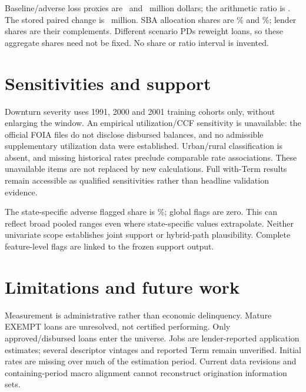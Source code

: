 Baseline/adverse loss proxies are \ElBase\ and \ElAdverse\ million dollars; the arithmetic ratio is \ElRatio. The stored paired change is \ElDiff\ million. SBA allocation shares are \ShareBase\% and \ShareAdverse\%; lender shares are their complements. Different scenario PDs reweight loans, so these aggregate shares need not be fixed. No share or ratio interval is invented.

\section{Sensitivities and support}
Downturn severity uses 1991, 2000 and 2001 training cohorts only, without enlarging the window. An empirical utilization/CCF sensitivity is unavailable: the official FOIA files do not disclose disbursed balances, and no admissible supplementary utilization data were established. Urban/rural classification is absent, and missing historical rates preclude comparable rate associations. These unavailable items are not replaced by new calculations. Full with-Term results remain accessible as qualified sensitivities rather than headline validation evidence.

The state-specific adverse flagged share is \SupportShare\%; global flags are zero. This can reflect broad pooled ranges even where state-specific values extrapolate. Neither univariate scope establishes joint support or hybrid-path plausibility. Complete feature-level flags are linked to the frozen support output.

\section{Limitations and future work}
Measurement is administrative rather than economic delinquency. Mature EXEMPT loans are unresolved, not certified performing. Only approved/disbursed loans enter the universe. Jobs are lender-reported application estimates; several descriptor vintages and reported Term remain unverified. Initial rates are missing over much of the estimation period. Current data revisions and containing-period macro alignment cannot reconstruct origination information sets.

